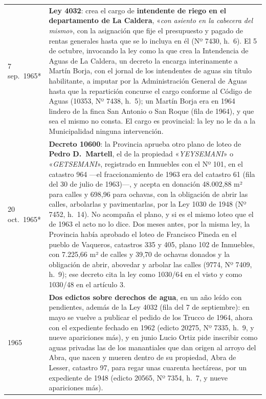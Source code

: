 \begin{longtable}{@{}p{2.7cm}p{10.3cm}@{}}
7 sep.\ 1965* & \textbf{Ley 4032}: crea el cargo de \textbf{intendente de riego en el departamento de La Caldera}, «\textit{con asiento en la cabecera del mismo}», con la asignación que fije el presupuesto y pagado de rentas generales hasta que se lo incluya en él (Nº 7430, h.\ 6). El 5 de octubre, invocando la ley como la que crea la Intendencia de Aguas de La Caldera, un decreto la encarga interinamente a Martín Borja, con el jornal de los intendentes de aguas sin título habilitante, a imputar por la Administración General de Aguas hasta que la repartición concurse el cargo conforme al Código de Aguas (10353, Nº 7438, h.\ 5); un Martín Borja era en 1964 lindero de la finca San Antonio o San Roque (fila de 1964), y que sea el mismo no consta. El cargo es provincial: la ley no le da a la Municipalidad ninguna intervención. \\
20 oct.\ 1965* & \textbf{Decreto 10600}: la Provincia aprueba otro plano de loteo de \textbf{Pedro D.\ Martell}, el de la propiedad «\textit{YEYSEMANI}» o «\textit{GETSEMANI}», registrado en Inmuebles con el Nº 101, en el catastro 964 ---el fraccionamiento de 1963 era del catastro 61 (fila del 30 de julio de 1963)---, y acepta en donación 48.002,88 m² para calles y 698,96 para ochavas, con la obligación de abrir las calles, arbolarlas y pavimentarlas, por la Ley 1030 de 1948 (Nº 7452, h.\ 14). No acompaña el plano, y si es el mismo loteo que el de 1963 el acto no lo dice. Dos meses antes, por la misma ley, la Provincia había aprobado el loteo de Francisco Pineda en el pueblo de Vaqueros, catastros 335 y 405, plano 102 de Inmuebles, con 7.225,66 m² de calles y 39,70 de ochavas donados y la obligación de abrir, abovedar y arbolar las calles (9774, Nº 7409, h.\ 9); ese decreto cita la ley como 1030/64 en el visto y como 1030/48 en el artículo 3. \\
1965 & \textbf{Dos edictos sobre derechos de agua}, en un año leído con pendientes, además de la Ley 4032 (fila del 7 de septiembre): en mayo se vuelve a publicar el pedido de los Trucco de 1964, ahora con el expediente fechado en 1962 (edicto 20275, Nº 7335, h.\ 9, y nueve apariciones más), y en junio Lucio Ortiz pide inscribir como aguas privadas las de los manantiales que dan origen al arroyo del Abra, que nacen y mueren dentro de su propiedad, Abra de Lesser, catastro 97, para regar unas cuarenta hectáreas, por un expediente de 1948 (edicto 20565, Nº 7354, h.\ 7, y nueve apariciones más). \\

\end{longtable}
